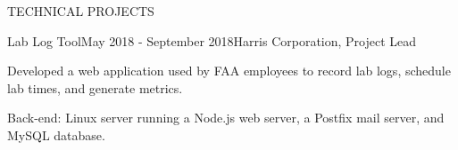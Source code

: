 \documentclass{article}
\begin{document}
\begin{rSection}{TECHNICAL PROJECTS}
  \begin{rSubsection}{Lab Log Tool}{May 2018 - September 2018}{Harris Corporation, Project Lead}{}
  \item Developed a web application used by FAA employees to record lab logs, schedule lab times, and generate metrics.
  \item Back-end: Linux server running a Node.js web server, a Postfix mail server, and MySQL database.
  \end{rSubsection}











\end{rSection}
\end{document}
